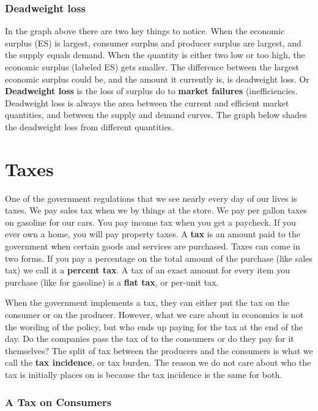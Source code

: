 \documentclass[
]{book}
\begin{document}
\subsection{Deadweight loss}\label{deadweight-loss}

In the graph above there are two key things to notice. When the economic surplus (ES) is largest, consumer surplus and producer surplus are largest, and the supply equals demand. When the quantity is either two low or too high, the economic surplus (labeled ES) gets smaller. The difference between the largest economic surplus could be, and the amount it currently is, is deadweight loss. Or \textbf{Deadweight loss} is the loss of surplus do to \textbf{market failures} (inefficiencies. Deadweight loss is always the area between the current and efficient market quantities, and between the supply and demand curves. The graph below shades the deadweight loss from different quantities.

\chapter{Taxes}\label{taxes}

One of the government regulations that we see nearly every day of our lives is taxes. We pay sales tax when we by things at the store. We pay per gallon taxes on gasoline for our cars. You pay income tax when you get a paycheck. If you ever own a home, you will pay property taxes. A \textbf{tax }is an amount paid to the government when certain goods and services are purchased. Taxes can come in two forms. If you pay a percentage on the total amount of the purchase (like sales tax) we call it a \textbf{percent tax}. A tax of an exact amount for every item you purchase (like for gasoline) is a \textbf{flat tax}, or per-unit tax.

When the government implements a tax, they can either put the tax on the consumer or on the producer. However, what we care about in economics is not the wording of the policy, but who ends up paying for the tax at the end of the day. Do the companies pass the tax of to the consumers or do they pay for it themselves? The split of tax between the producers and the consumers is what we call the \textbf{tax incidence}, or tax burden. The reason we do not care about who the tax is initially places on is because the tax incidence is the same for both.

\subsection{A Tax on Consumers}\label{a-tax-on-consumers}
\end{document}
